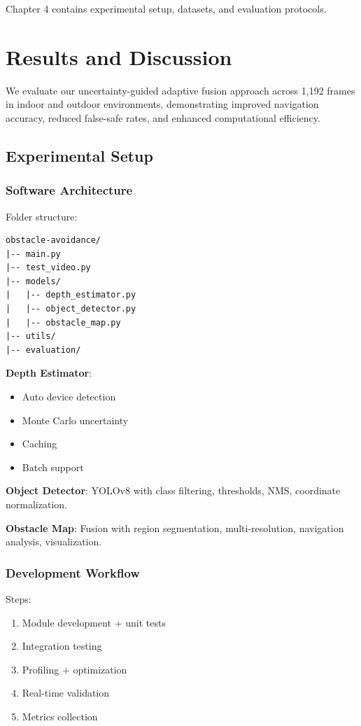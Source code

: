 \documentclass[12pt,oneside]{book}
\begin{document}
Chapter 4 contains experimental setup, datasets, and evaluation protocols.


\chapter{Results and Discussion}

We evaluate our uncertainty-guided adaptive fusion approach across 1,192 frames in indoor and outdoor environments, demonstrating improved navigation accuracy, reduced false-safe rates, and enhanced computational efficiency.


\section{Experimental Setup}

\subsection{Software Architecture}

Folder structure:

\begin{verbatim}
obstacle-avoidance/
|-- main.py
|-- test_video.py
|-- models/
|   |-- depth_estimator.py
|   |-- object_detector.py
|   |-- obstacle_map.py
|-- utils/
|-- evaluation/
\end{verbatim}

\textbf{Depth Estimator}:
\begin{itemize}
\item Auto device detection
\item Monte Carlo uncertainty
\item Caching
\item Batch support
\end{itemize}

\textbf{Object Detector}:
YOLOv8 with class filtering, thresholds, NMS, coordinate normalization.

\textbf{Obstacle Map}:
Fusion with region segmentation, multi-resolution, navigation analysis, visualization.

\subsection{Development Workflow}

Steps:
\begin{enumerate}
\item Module development + unit tests
\item Integration testing
\item Profiling + optimization
\item Real-time validation
\item Metrics collection
\end{enumerate}
\end{document}
